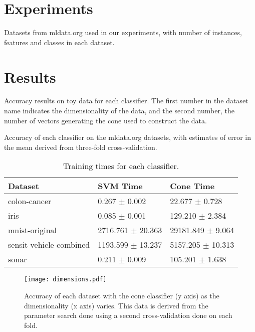\documentclass{article}
\begin{document}
\section{Experiments}

\begin{table}
\begin{center}
\end{center}
\caption{Datasets from mldata.org used in our experiments, with number
  of instances, features and classes in each dataset.}
\end{table}

\section{Results}

\begin{table*}
\begin{center}
\end{center}
\caption{Accuracy results on toy data for each classifier. The first
  number in the dataset name indicates the dimensionality of the data,
  and the second number, the number of vectors generating the cone used
  to construct the data.}
\end{table*}

\begin{table*}
\begin{center}
\end{center}
\caption{Accuracy of each classifier on the mldata.org datasets, with
  estimates of error in the mean derived from three-fold
  cross-validation.}
\end{table*}


\begin{table*}
\begin{center}
\begin{tabular}{|l|l|l|}
\hline
Dataset & SVM Time & Cone Time\\
\hline
colon-cancer & 0.267 $\pm$ 0.002 & 22.677 $\pm$ 0.728\\
iris & 0.085 $\pm$ 0.001 & 129.210 $\pm$ 2.384\\
mnist-original & 2716.761 $\pm$ 20.363 & 29181.849 $\pm$ 9.064\\
sensit-vehicle-combined & 1193.599 $\pm$ 13.237 & 5157.205 $\pm$ 10.313\\
sonar & 0.211 $\pm$ 0.009 & 105.201 $\pm$ 1.638\\
\hline
\end{tabular}
\end{center}
\caption{Training times for each classifier.}
\end{table*}


\begin{figure}
\begin{center}
\texttt{[image: dimensions.pdf]}
\end{center}
\caption{Accuracy of each dataset with the cone classifier (y axis) as
  the dimensionality (x axis) varies. This data is derived from the
  parameter search done using a second cross-validation done on each
  fold.}
\end{figure}



\end{document}
